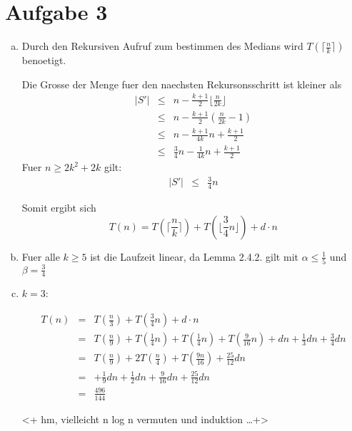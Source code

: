 \section*{Aufgabe 3}
\begin{enumerate}[(a)]
\item

Durch den Rekursiven Aufruf zum bestimmen des Medians wird $T(\lceil \frac{n}{k} \rceil)$ benoetigt.

Die Grosse der Menge fuer den naechsten Rekursonsschritt ist kleiner als 
\begin{eqnarray}
|S'| &\leq& n - \frac{k+1}{2} \lfloor \frac{n}{2 k} \rfloor \\
     &\leq& n - \frac{k+1}{2} \left( \frac{n}{2k}-1 \right) \\
     &\leq& n - \frac{k+1}{4k} n + \frac{k+1}{2} \\
     &\leq& \frac{3}{4}n - \frac{1}{4k} n + \frac{k+1}{2}
\end{eqnarray}
Fuer $n \geq 2k^2+2k$ gilt:
\begin{eqnarray}
     |S'| &\leq& \frac{3}{4}n
\end{eqnarray}

Somit ergibt sich 
\begin{equation}
T(n) = T\left( \lceil \frac{n}{k} \rceil \right) + T \left( \lfloor \frac{3}{4} n \rfloor  \right) + d \cdot n
\end{equation}

\item Fuer alle $k \geq 5$ ist die Laufzeit linear, da Lemma 2.4.2. gilt mit $\alpha \leq \frac{1}{5}$ und $\beta = \frac{3}{4}$ 

\item $k=3$:

\begin{eqnarray}
T(n) &=& T\left( \frac{n}{3} \right) + T\left(\frac{3}{4} n\right) + d \cdot n \\
     &=& T\left( \frac{n}{9} \right) + T\left( \frac{1}{4} n \right) + T\left( \frac{1}{4}n \right) + T\left( \frac{9}{16}n \right) 
         + d n + \frac{1}{3} d n + \frac{3}{4} d n\\
     &=& T\left( \frac{n}{9} \right) + 2 T\left( \frac{n}{4} \right) + T\left( \frac{9n}{16} \right) 
         + \frac{25}{12} dn \\
     &=& 
         + \frac{1}{9} dn + \frac{1}{2} dn + \frac{9}{16} dn + \frac{25}{12} dn  \\
     &=& \frac{496}{144}
\end{eqnarray}

<+ hm, vielleicht n log n vermuten und induktion \ldots +>


\end{enumerate}



